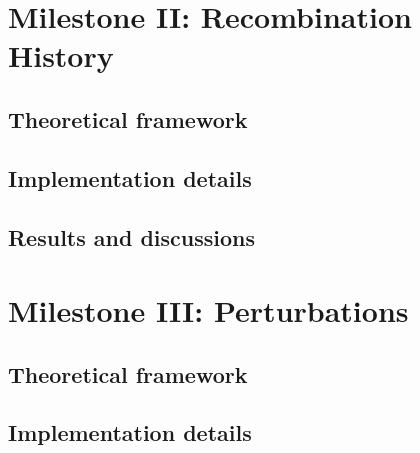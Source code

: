 \documentclass{aa}
\begin{document}
\section{Milestone II: Recombination History}\label{sec: milestone II}

\subsection{Theoretical framework}\label{subsec: II theory}

\subsection{Implementation details}\label{subsec: II methods}

\subsection{Results and discussions}\label{subsec: II results}



\section{Milestone III: Perturbations}\label{sec: milestone III}

\subsection{Theoretical framework}\label{subsec: III theory}

\subsection{Implementation details}\label{subsec: III methods}
\end{document}
